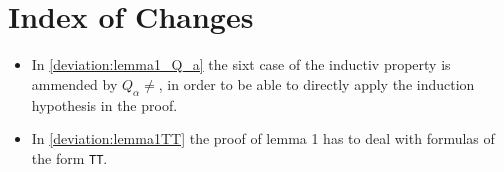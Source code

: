 \section{Index of Changes}
\begin{itemize}
    \item In \ref{deviation:lemma1_Q_a} the sixt case of the inductiv property is ammended by $Q_\alpha \neq {}$,
    in order to be able to directly apply the induction hypothesis in the proof.
    \item In \ref{deviation:lemma1TT} the proof of lemma 1 has to deal with formulas of the form \texttt{TT}. 
\end{itemize}